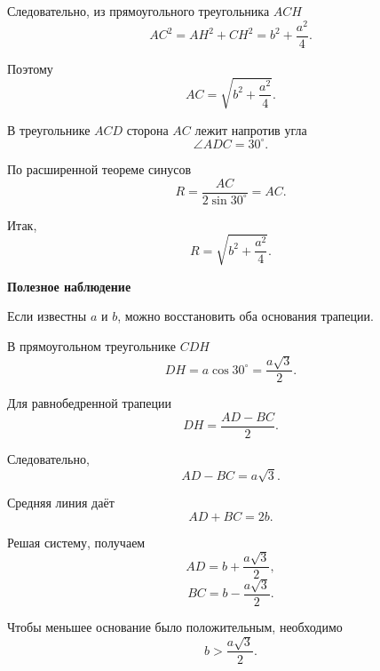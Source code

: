 \documentclass[a4paper,12pt]{article}
\newcommand{\Subsection}[1]{%
    \vspace{0.3em}%
    {\large\bfseries\color{accent}#1}\par
    \vspace{0.25em}%
}
\begin{document}
Следовательно,
из прямоугольного треугольника $ACH$
\[
AC^2
=
AH^2+CH^2
=
b^2+\frac{a^2}{4}.
\]

Поэтому
\[
AC
=
\sqrt{
    b^2+\frac{a^2}{4}
}.
\]

В треугольнике $ACD$
сторона $AC$ лежит напротив угла
\[
\angle ADC=30^\circ.
\]

По расширенной теореме синусов
\[
R
=
\frac{AC}{2\sin30^\circ}
=
AC.
\]

Итак,
\[
\boxed{
R=
\sqrt{
    b^2+\frac{a^2}{4}
}
}.
\]

\Subsection{Полезное наблюдение}

Если известны $a$ и $b$,
можно восстановить оба основания трапеции.

В прямоугольном треугольнике $CDH$
\[
DH
=
a\cos30^\circ
=
\frac{a\sqrt3}{2}.
\]

Для равнобедренной трапеции
\[
DH
=
\frac{AD-BC}{2}.
\]

Следовательно,
\[
AD-BC=a\sqrt3.
\]

Средняя линия даёт
\[
AD+BC=2b.
\]

Решая систему,
получаем
\[
\boxed{
AD=b+\frac{a\sqrt3}{2}
},
\]
\[
\boxed{
BC=b-\frac{a\sqrt3}{2}
}.
\]

Чтобы меньшее основание было положительным,
необходимо
\[
\boxed{
b>\frac{a\sqrt3}{2}
}.
\]

\clearpage

\end{document}
